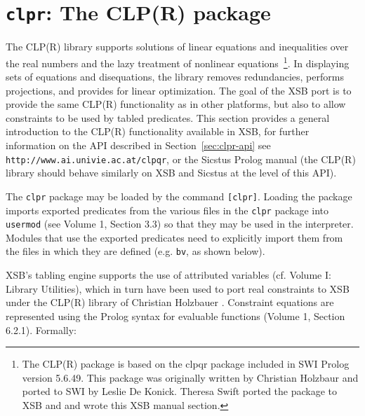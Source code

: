 \section{{\tt clpr}: The CLP(R) package} \label{sec:clpr}
%
The CLP(R) library supports solutions of linear equations and
inequalities over the real numbers and the lazy treatment of nonlinear
equations~\footnote{The CLP(R) package is based on the clpqr package
  included in SWI Prolog version 5.6.49.  This package was originally
  written by Christian Holzbaur and ported to SWI by Leslie De Konick.
  Theresa Swift ported the package to XSB and and wrote this XSB
  manual section.}.  In displaying sets of equations and disequations,
the library removes redundancies, performs projections, and provides
for linear optimization.  The goal of the XSB port is to provide the
same CLP(R) functionality as in other platforms, but also to allow
constraints to be used by tabled predicates.  This section provides a
general introduction to the CLP(R) functionality available in XSB, for
further information on the API described in Section~\ref{sec:clpr-api}
see {\tt http://www.ai.univie.ac.at/clpqr}, or the Sicstus Prolog
manual (the CLP(R) library should behave similarly on XSB and Sicstus
at the level of this API).

The {\tt clpr} package may be loaded by the command {\tt [clpr]}.
Loading the package imports exported predicates from the various files
in the {\tt clpr} package into {\tt usermod} (see Volume 1, Section
3.3) so that they may be used in the interpreter.  Modules that use
the exported predicates need to explicitly import them from the files
in which they are defined (e.g. {\tt bv}, as shown below).

XSB's tabling engine supports the use of attributed variables
(cf. Volume I: Library Utilities), which in turn have been used to
port real constraints to XSB under the CLP(R) library of Christian
Holzbauer \cite{Holz95}.  Constraint equations are represented using
the Prolog syntax for evaluable functions (Volume 1, Section 6.2.1).
Formally:

